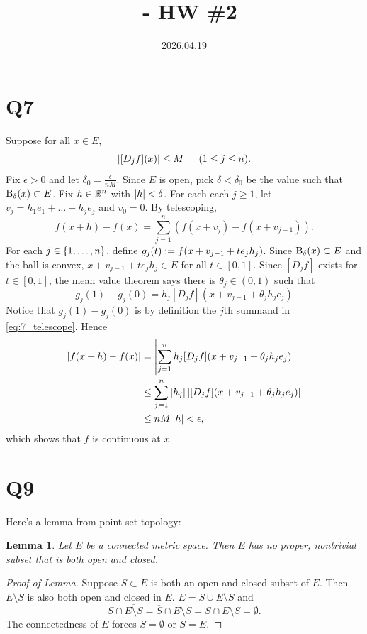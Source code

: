 \documentclass[12pt]{article}
\title{\course\ - HW \#2}
\author{\myname}
\date{2026.04.19}
\newtheorem*{lemma}{Lemma}
\begin{document}
\maketitle
\thispagestyle{fancy}


\graphicspath{{./img/}}

\newcommand{\Djf}[2]{[D_{#1}#2]}
\newcommand{\grad}[1]{[\nabla #1]}

\section*{Q7}
Suppose for all $x \in E$, 
$$\abs{\Djf{j}{f}(x)} \leq M \hspace{1.5em} (1 \leq j \leq n).$$
Fix $\epsilon > 0$ and let $\delta_0 = \frac{\epsilon}{nM}$. 
Since $E$ is open, pick $\delta < \delta_0$ be the value such that $\text{B}_{\delta}(x) \subset E$. 
Fix $h \in \mathbb{R}^n$ with $\left|h\right| < \delta$. 
For each each $j \geq 1$, let $v_j = h_1 e_1 + \ldots + h_j e_j$ and $v_0 = 0$. 
By telescoping, 
\begin{equation} \label{eq:7_telescope}
  f(x + h) - f(x) = \sum_{j = 1}^{n}(f(x + v_j) - f(x + v_{j - 1})).
\end{equation}
For each $j \in \{1, \ldots, n\}$, define $g_{j}(t) \vcentcolon= f(x + v_{j - 1} + te_j h_j)$. 
Since $\text{B}_{\delta}(x) \subset E$ and the ball is convex, $x + v_{j - 1} + t e_j h_j \in E$ for all $t \in [0, 1]$. 
Since $\Djf{j}{f}$ exists for $t \in [0, 1]$, the mean value theorem says there is $\theta_j \in (0, 1)$ such that 
$$g_{j}(1) - g_{j}(0) = h_j \Djf{j}{f}(x + v_{j - 1} + \theta_j h_j e_j)$$
Notice that $g_{j}(1) - g_{j}(0)$ is by definition the $j$th summand in \eqref{eq:7_telescope}. 
Hence 
\begin{align*}
  \abs{f(x + h) - f(x)} & = \abs{\sum_{j = 1}^{n} h_j \Djf{j}{f}(x + v_{j - 1} + \theta_j h_j e_j)} \\ 
                             & \leq \sum_{j = 1}^{n} \abs{h_j} \abs{\Djf{j}{f}(x + v_{j - 1} + \theta_j h_j e_j)} \\ 
                             & \leq nM\abs{h} < \epsilon,
\end{align*}
which shows that $f$ is continuous at $x$. 

\section*{Q9}
Here's a lemma from point-set topology: 
\begin{lemma}
  Let $E$ be a connected metric space. 
  Then $E$ has no proper, nontrivial subset that is both open and closed. 
\end{lemma}
\begin{proof}[Proof of Lemma]
  Suppose $S \subset E$ is both an open and closed subset of $E$. 
  Then $E \setminus S$ is also both open and closed in $E$. 
  $E = S \cup E \setminus S$ and 
  $$S \cap \overline{E \setminus S} = \overline{S} \cap E \setminus S = S \cap E \setminus S = \emptyset.$$
  The connectedness of $E$ forces $S = \emptyset$ or $S = E$. 
\end{proof}
\end{document}
